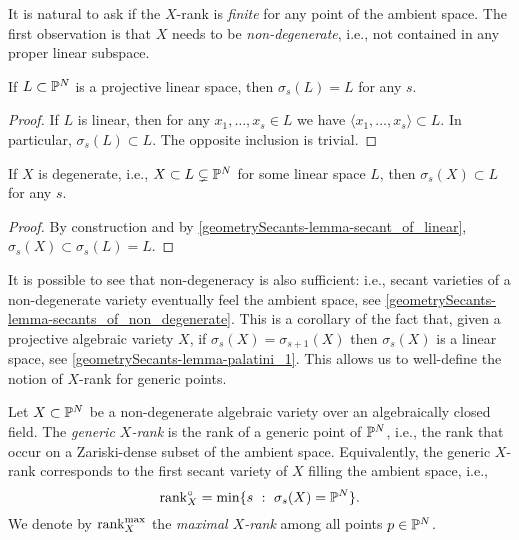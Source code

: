  It is natural to ask if the $X$-rank is \emph{finite} for any point of the ambient space. The first observation is that $X$ needs to be \emph{non-degenerate}, i.e., not contained in any proper linear subspace.

 \begin{lemma}
    \label{geometrySecants-lemma-secant_of_linear}
    If $L \subset \mathbb{P}^N$ is a projective linear space, then $\sigma_s(L) = L$ for any $s$.
 \end{lemma}
 \begin{proof}
    If $L$ is linear, then for any $x_1,\ldots,x_s \in L$ we have $\langle x_1,\ldots,x_s \rangle \subset L$. In particular, $\sigma_s(L) \subset L$. The opposite inclusion is trivial.
 \end{proof}
 \begin{corollary}
    \label{geometrySecants-corollary-secant_of_degenerate_is_degenerate}
    If $X$ is degenerate, i.e., $X \subset L \subsetneq \mathbb{P}^N$ for some linear space $L$, then $\sigma_s(X) \subset L$ for any $s$.
 \end{corollary}
 \begin{proof}
    By construction and by \ref{geometrySecants-lemma-secant_of_linear}, $\sigma_s(X) \subset \sigma_s(L) = L$.
 \end{proof}

 It is possible to see that non-degeneracy is also sufficient: i.e., secant varieties of a non-degenerate variety eventually feel the ambient space, see \ref{geometrySecants-lemma-secants_of_non_degenerate}. This is a corollary of the fact that, given a projective algebraic variety $X$, if $\sigma_s(X) = \sigma_{s+1}(X)$ then $\sigma_s(X)$ is a linear space, see \ref{geometrySecants-lemma-palatini_1}. This allows us to well-define the notion of $X$-rank for generic points.
 
 \begin{definition}
     \label{geometrySecants-definition-generic_rank}
     Let $X \subset \mathbb{P}^N$ be a non-degenerate algebraic variety over an algebraically closed field. The \emph{generic $X$-rank} is the rank of a generic point of $\mathbb{P}^N$, i.e., the rank that occur on a Zariski-dense subset of the ambient space. Equivalently, the generic $X$-rank corresponds to the first secant variety of $X$ filling the ambient space, i.e., 
     \[
         \mathrm{rank}_X^\circ = \min\{s ~:~ \sigma_s(X) = \mathbb{P}^N\}.
     \]
     We denote by $\mathrm{rank}_X^{\max}$ the \emph{maximal $X$-rank} among all points $p \in \mathbb{P}^N$. 
 \end{definition}

